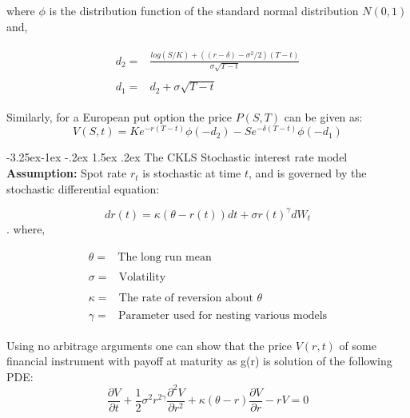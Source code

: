 \documentclass[11pt]{article}
\makeatletter
\renewcommand\subsection{\@startsection{subsection}{2}{\z@}%
                                         {-3.25ex\@plus -1ex \@minus -.2ex}%
                                         {1.5ex \@plus .2ex}%
                                         {\normalfont\fontfamily{phv}\fontsize{14}{17}\bfseries}}
\makeatother
\begin{document}
where $\phi$ is the distribution function of the standard normal distribution $N(0,1)$ and,

\begin{align*}
    \begin{split}
        d_{2} ={}& \frac{log(S/K) + ((r-\delta) - \sigma^{2}/2)(T-t)}{\sigma \sqrt{T-t}} 
    \end{split}\\
    \begin{split}
        d_{1} ={}& d_{2} + \sigma \sqrt{T-t}
    \end{split} 
\end{align*}

Similarly, for a European put option the price $P(S,T)$ can be given as:
\begin{equation*}
    V(S,t) = Ke^{-r(T-t)}\phi(-d_{2}) - Se^{-\delta(T-t)}\phi(-d_{1})
\end{equation*}

\subsection{The CKLS Stochastic interest rate model}
\textbf{Assumption: }Spot rate $r_{t}$ is stochastic at time $t$, and is governed by the stochastic differential equation:

\begin{equation*}
    dr(t) = \kappa(\theta - r(t))dt + \sigma r(t)^{\gamma}dW_{t}
\end{equation*}.
where,

\begin{align*}
    \begin{split}
        \theta ={}& \mbox{The long run mean}
    \end{split}\\
    \begin{split}
        \sigma ={}& \mbox{Volatility}
    \end{split}\\
    \begin{split}
        \kappa ={}& \mbox{The rate of reversion about $\theta$}
    \end{split}\\
    \begin{split}
        \gamma ={}& \mbox{Parameter used for nesting various models}
    \end{split}
\end{align*}

Using no arbitrage arguments one can show that the price $V(r,t)$ of some financial instrument with payoff at maturity as g(r) is solution of the following PDE:
\begin{equation}
    \frac{\partial V}{\partial t} + \frac{1}{2} \sigma^{2}r^{2\gamma}\frac{\partial^{2}V}{\partial r^{2}} + \kappa(\theta-r)\frac{\partial V}{\partial r} - rV = 0
\end{equation}
\end{document}

